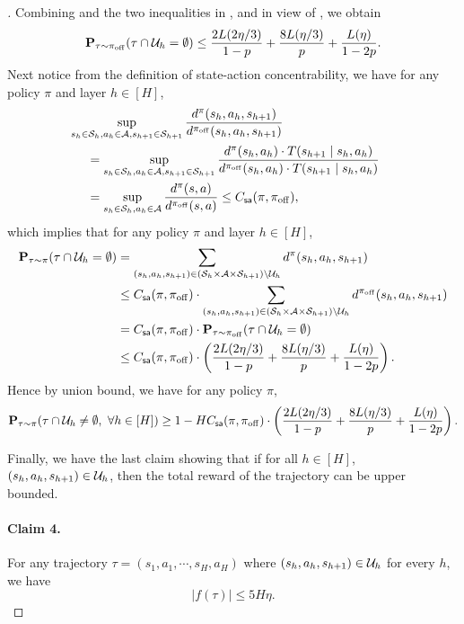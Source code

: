\documentclass{article}
\let\oldparagraph\paragraph
\renewcommand{\paragraph}[1]{\oldparagraph{#1.}}
\begin{document}
\begin{proof}[]
    Combining  and the two inequalities in , and in view of , we obtain
    \[\mathbf{P}_{\tau\sim \pi_{\mathrm{off}}}(\tau\cap \mathcal{U}_h = \emptyset)\le \frac{2L(2\eta/3)}{1-p} + \frac{8L(\eta/3)}{p} + \frac{L(\eta)}{1 - 2p}.\]
    Next notice from the definition of state-action concentrability, we have for any policy $\pi$ and layer $h\in [H]$,
    \begin{align*} 
        &\hspace{-0.5cm}\sup_{s_h\in \calS_h, a_h\in \calA, s_{h+1}\in \calS_{h+1}} \frac{d^\pi(s_h, a_h, s_{h+1})}{d^{\pioff}(s_h, a_h, s_{h+1})}\\
        & = \sup_{s_h\in \calS_h, a_h\in \calA, s_{h+1}\in \calS_{h+1}} \frac{d^\pi(s_h, a_h)\cdot T(s_{h+1}\mid s_h, a_h)}{d^{\pioff}(s_h, a_h)\cdot T(s_{h+1}\mid s_h, a_h)}\\
        & = \sup_{s_h\in \calS_h, a_h\in \calA} \frac{d^\pi(s, a)}{d^{\pioff}(s, a)}\le \Cs(\pi, \pioff),
    \end{align*}
    which implies that for any policy $\pi$ and layer $h\in [H]$, 
    \begin{align*} 
        \mathbf{P}_{\tau\sim \pi}(\tau\cap \mathcal{U}_h = \emptyset) & = \sum_{(s_h, a_h, s_{h+1})\in (\mathcal{S}_h\times\mathcal{A}\times\mathcal{S}_{h+1})\backslash \mathcal{U}_h} d^\pi(s_h, a_h, s_{h+1})\\ 
        & \le C_{\mathsf{sa}}(\pi, \pi_{\mathrm{off}})\cdot \sum_{(s_h, a_h, s_{h+1})\in (\mathcal{S}_h\times\mathcal{A}\times\mathcal{S}_{h+1})\backslash \mathcal{U}_h} d^{\pi_{\mathrm{off}}}(s_h, a_h, s_{h+1})\\
        & = C_{\mathsf{sa}}(\pi, \pi_{\mathrm{off}})\cdot \mathbf{P}_{\tau\sim \pi_{\mathrm{off}}} (\tau\cap \mathcal{U}_h = \emptyset)\\
        &\le C_{\mathsf{sa}}(\pi, \pi_{\mathrm{off}})\cdot\left(\frac{2L(2\eta/3)}{1-p} + \frac{8L(\eta/3)}{p} + \frac{L(\eta)}{1 - 2p}\right).
    \end{align*}
    Hence by union bound, we have for any policy $\pi$, 
    \[\mathbf{P}_{\tau\sim \pi}(\tau\cap \mathcal{U}_h\neq \emptyset,\ \forall h\in [H])\ge 1 - HC_{\mathsf{sa}}(\pi, \pi_{\mathrm{off}})\cdot\left(\frac{2L(2\eta/3)}{1-p} + \frac{8L(\eta/3)}{p} + \frac{L(\eta)}{1 - 2p}\right).\]

    Finally, we have the last claim showing that if for all $h\in [H]$, $(s_h, a_h, s_{h+1})\in \mathcal{U}_h$, then the total reward of the trajectory can be upper bounded.
    
    \paragraph{Claim 4} For any trajectory $\tau = (s_1, a_1, \cdots, s_H, a_H)$ where $(s_h, a_h, s_{h+1})\in \mathcal{U}_h$ for every $h$, we have 
    \[\left|f(\tau)\right|\le 5H\eta.\]

\end{proof}
\end{document}
